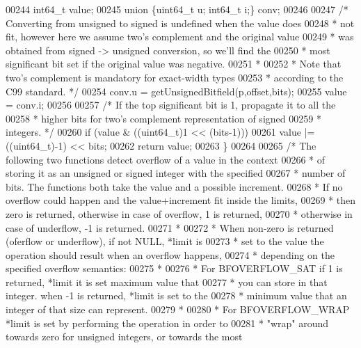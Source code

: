 \begin{DoxyCode}
00244     int64\_t value;
00245     \textcolor{keyword}{union} \{uint64\_t u; int64\_t i;\} conv;
00246 
00247     \textcolor{comment}{/* Converting from unsigned to signed is undefined when the value does}
00248 \textcolor{comment}{     * not fit, however here we assume two's complement and the original value}
00249 \textcolor{comment}{     * was obtained from signed -> unsigned conversion, so we'll find the}
00250 \textcolor{comment}{     * most significant bit set if the original value was negative.}
00251 \textcolor{comment}{     *}
00252 \textcolor{comment}{     * Note that two's complement is mandatory for exact-width types}
00253 \textcolor{comment}{     * according to the C99 standard. */}
00254     conv.u = getUnsignedBitfield(p,offset,bits);
00255     value = conv.i;
00256 
00257     \textcolor{comment}{/* If the top significant bit is 1, propagate it to all the}
00258 \textcolor{comment}{     * higher bits for two's complement representation of signed}
00259 \textcolor{comment}{     * integers. */}
00260     \textcolor{keywordflow}{if} (value & ((uint64\_t)1 << (bits-1)))
00261         value |= ((uint64\_t)-1) << bits;
00262     \textcolor{keywordflow}{return} value;
00263 \}
00264 
00265 \textcolor{comment}{/* The following two functions detect overflow of a value in the context}
00266 \textcolor{comment}{ * of storing it as an unsigned or signed integer with the specified}
00267 \textcolor{comment}{ * number of bits. The functions both take the value and a possible increment.}
00268 \textcolor{comment}{ * If no overflow could happen and the value+increment fit inside the limits,}
00269 \textcolor{comment}{ * then zero is returned, otherwise in case of overflow, 1 is returned,}
00270 \textcolor{comment}{ * otherwise in case of underflow, -1 is returned.}
00271 \textcolor{comment}{ *}
00272 \textcolor{comment}{ * When non-zero is returned (oferflow or underflow), if not NULL, *limit is}
00273 \textcolor{comment}{ * set to the value the operation should result when an overflow happens,}
00274 \textcolor{comment}{ * depending on the specified overflow semantics:}
00275 \textcolor{comment}{ *}
00276 \textcolor{comment}{ * For BFOVERFLOW\_SAT if 1 is returned, *limit it is set maximum value that}
00277 \textcolor{comment}{ * you can store in that integer. when -1 is returned, *limit is set to the}
00278 \textcolor{comment}{ * minimum value that an integer of that size can represent.}
00279 \textcolor{comment}{ *}
00280 \textcolor{comment}{ * For BFOVERFLOW\_WRAP *limit is set by performing the operation in order to}
00281 \textcolor{comment}{ * "wrap" around towards zero for unsigned integers, or towards the most}

\end{DoxyCode}
